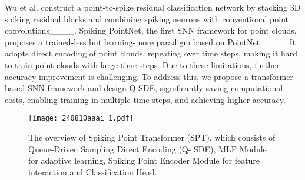 Wu et al. construct a point-to-spike residual classification network by stacking 3D spiking residual blocks and combining spiking neurons with conventional point convolutions____. Spiking PointNet, the first SNN framework for point clouds, proposes a trained-less but learning-more paradigm based on PointNet____. It adopts direct encoding of point clouds, repeating over time steps, making it hard to train point clouds with large time steps. Due to these limitations, further accuracy improvement is challenging. To address this, we propose a transformer-based SNN framework and design Q-SDE, significantly saving computational costs, enabling training in multiple time steps, and achieving higher accuracy.



\begin{figure*}[t]
    \centering
    \texttt{[image: 240810aaai\_1.pdf]}
    \caption{The overview of Spiking Point Transformer (SPT), which consists of Queue-Driven Sampling Direct Encoding (Q-
    SDE), MLP Module for adaptive learning, Spiking Point Encoder Module for feature interaction and Classification Head.}
    \label{fig:1}
\end{figure*}